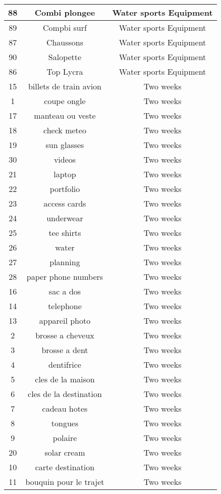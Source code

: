 \begin{longtable}{|c|c|c|}
\hline
88 & Combi plongee & Water sports Equipment\\
\hline
89 & Compbi surf & Water sports Equipment\\
\hline
87 & Chaussons & Water sports Equipment\\
\hline
90 & Salopette & Water sports Equipment\\
\hline
86 & Top Lycra & Water sports Equipment\\
\hline
15 & billets de train avion & Two weeks\\
\hline
1 & coupe ongle & Two weeks\\
\hline
17 & manteau ou veste  & Two weeks\\
\hline
18 & check meteo & Two weeks\\
\hline
19 & sun glasses & Two weeks\\
\hline
30 & videos & Two weeks\\
\hline
21 & laptop & Two weeks\\
\hline
22 & portfolio & Two weeks\\
\hline
23 & access cards & Two weeks\\
\hline
24 & underwear & Two weeks\\
\hline
25 & tee shirts & Two weeks\\
\hline
26 & water & Two weeks\\
\hline
27 & planning & Two weeks\\
\hline
28 & paper phone numbers & Two weeks\\
\hline
16 & sac a dos & Two weeks\\
\hline
14 & telephone & Two weeks\\
\hline
13 & appareil photo & Two weeks\\
\hline
2 & brosse a cheveux & Two weeks\\
\hline
3 & brosse a dent & Two weeks\\
\hline
4 & dentifrice & Two weeks\\
\hline
5 & cles de la maison & Two weeks\\
\hline
6 & cles de la destination & Two weeks\\
\hline
7 & cadeau hotes & Two weeks\\
\hline
8 & tongues & Two weeks\\
\hline
9 & polaire & Two weeks\\
\hline
20 & solar cream & Two weeks\\
\hline
10 & carte destination & Two weeks\\
\hline
11 & bouquin pour le trajet & Two weeks\\

\end{longtable}
